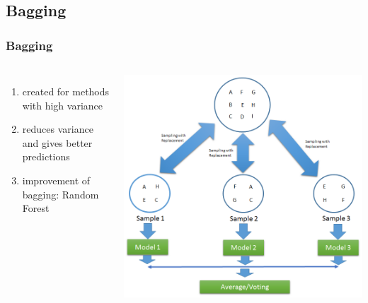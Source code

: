 \subsection{Bagging}

\begin{frame}
    \frametitle{Bagging}
    \begin{columns}[c] %
    
    \begin{enumerate}
    \item created for methods with high variance
    \item reduces variance and gives better predictions
    \item improvement of bagging: 
    \newline Random Forest
    \end{enumerate}
    

	\begin{center}		
		\includegraphics[height=0.7\textheight]{images/bagging.png}
	\end{center}

    
    \end{columns}
\end{frame}